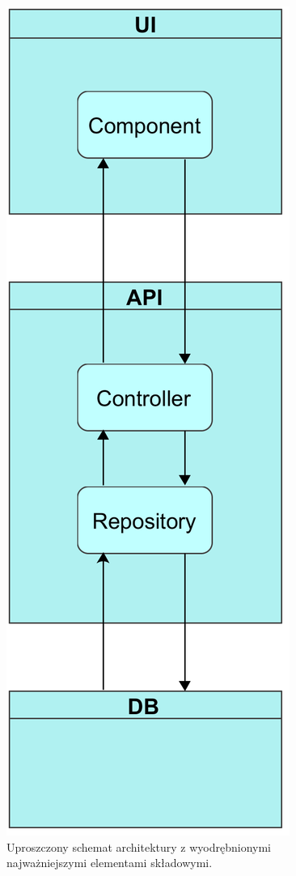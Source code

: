 \documentclass[eng,printmode,openany]{mgr}
\begin{document}
	\begin{figure}[H]
		\centering
		\includegraphics[scale=0.2]{images/architecture.png}
		\caption{Uproszczony schemat architektury z wyodrębnionymi najważniejszymi elementami składowymi.}
	\end{figure}	
	
\end{document}
